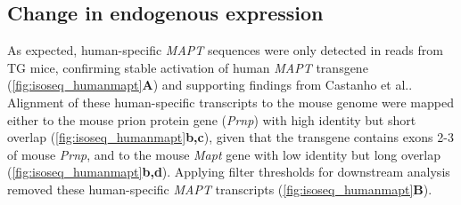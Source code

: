 \subsection{Change in endogenous expression}
As expected, human-specific \textit{MAPT} sequences were only detected in reads from TG mice, confirming stable activation of human \textit{MAPT} transgene (\cref{fig:isoseq_humanmapt}\textbf{A}) and supporting findings from Castanho et al.\cite{Castanho2020}. Alignment of these human-specific transcripts to the mouse genome were mapped either to the mouse prion protein gene (\textit{Prnp}) with high identity but short overlap (\cref{fig:isoseq_humanmapt}\textbf{b,c}), given that the transgene contains exons 2-3 of mouse \textit{Prnp}\cite{Ramsden2005}, and to the mouse \textit{Mapt} gene with low identity but long overlap (\cref{fig:isoseq_humanmapt}\textbf{b,d}). Applying filter thresholds for downstream analysis removed these human-specific \textit{MAPT} transcripts (\cref{fig:isoseq_humanmapt}\textbf{B}). 

